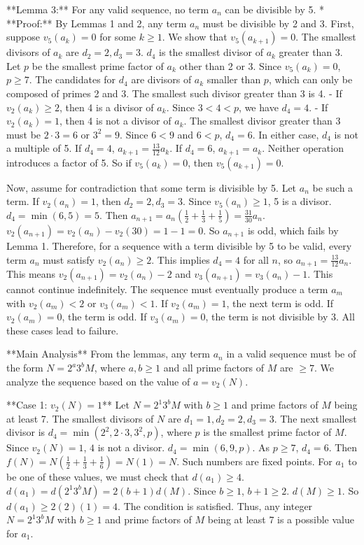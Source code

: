 \documentclass[12pt]{article}
\begin{document}
**Lemma 3:** For any valid sequence, no term $a_n$ can be divisible by 5.
*   **Proof:** By Lemmas 1 and 2, any term $a_n$ must be divisible by 2 and 3.
    First, suppose $v_5(a_k)=0$ for some $k \ge 1$. We show that $v_5(a_{k+1})=0$.
    The smallest divisors of $a_k$ are $d_2=2, d_3=3$. $d_4$ is the smallest divisor of $a_k$ greater than 3. Let $p$ be the smallest prime factor of $a_k$ other than 2 or 3. Since $v_5(a_k)=0$, $p \ge 7$. The candidates for $d_4$ are divisors of $a_k$ smaller than $p$, which can only be composed of primes 2 and 3. The smallest such divisor greater than 3 is 4.
    - If $v_2(a_k) \ge 2$, then 4 is a divisor of $a_k$. Since $3 < 4 < p$, we have $d_4=4$.
    - If $v_2(a_k) = 1$, then 4 is not a divisor of $a_k$. The smallest divisor greater than 3 must be $2 \cdot 3 = 6$ or $3^2=9$. Since $6 < 9$ and $6 < p$, $d_4=6$.
    In either case, $d_4$ is not a multiple of 5.
    If $d_4=4$, $a_{k+1} = \frac{13}{12}a_k$. If $d_4=6$, $a_{k+1}=a_k$. Neither operation introduces a factor of 5. So if $v_5(a_k)=0$, then $v_5(a_{k+1})=0$.

    Now, assume for contradiction that some term is divisible by 5. Let $a_n$ be such a term.
    If $v_2(a_n)=1$, then $d_2=2, d_3=3$. Since $v_5(a_n)\ge 1$, 5 is a divisor. $d_4=\min(6,5)=5$.
    Then $a_{n+1} = a_n\left(\frac{1}{2}+\frac{1}{3}+\frac{1}{5}\right) = \frac{31}{30}a_n$.
    $v_2(a_{n+1}) = v_2(a_n) - v_2(30) = 1-1=0$. So $a_{n+1}$ is odd, which fails by Lemma 1.
    Therefore, for a sequence with a term divisible by 5 to be valid, every term $a_n$ must satisfy $v_2(a_n) \ge 2$.
    This implies $d_4=4$ for all $n$, so $a_{n+1} = \frac{13}{12}a_n$. This means $v_2(a_{n+1}) = v_2(a_n)-2$ and $v_3(a_{n+1}) = v_3(a_n)-1$. This cannot continue indefinitely. The sequence must eventually produce a term $a_m$ with $v_2(a_m)<2$ or $v_3(a_m)<1$. If $v_2(a_m)=1$, the next term is odd. If $v_2(a_m)=0$, the term is odd. If $v_3(a_m)=0$, the term is not divisible by 3. All these cases lead to failure.

**Main Analysis**
From the lemmas, any term $a_n$ in a valid sequence must be of the form $N=2^a 3^b M$, where $a,b \ge 1$ and all prime factors of $M$ are $\ge 7$. We analyze the sequence based on the value of $a=v_2(N)$.

**Case 1: $v_2(N)=1$**
Let $N = 2^1 3^b M$ with $b \ge 1$ and prime factors of $M$ being at least 7. The smallest divisors of $N$ are $d_1=1, d_2=2, d_3=3$. The next smallest divisor is $d_4=\min(2^2, 2\cdot3, 3^2, p)$, where $p$ is the smallest prime factor of $M$. Since $v_2(N)=1$, $4$ is not a divisor. $d_4=\min(6,9,p)$. As $p \ge 7$, $d_4=6$.
Then $f(N) = N\left(\frac{1}{2}+\frac{1}{3}+\frac{1}{6}\right) = N(1) = N$.
Such numbers are fixed points. For $a_1$ to be one of these values, we must check that $d(a_1) \ge 4$.
$d(a_1) = d(2^1 3^b M) = 2(b+1)d(M)$. Since $b \ge 1$, $b+1 \ge 2$. $d(M) \ge 1$.
So $d(a_1) \ge 2(2)(1) = 4$. The condition is satisfied.
Thus, any integer $N=2^1 3^b M$ with $b \ge 1$ and prime factors of $M$ being at least 7 is a possible value for $a_1$.
\end{document}
